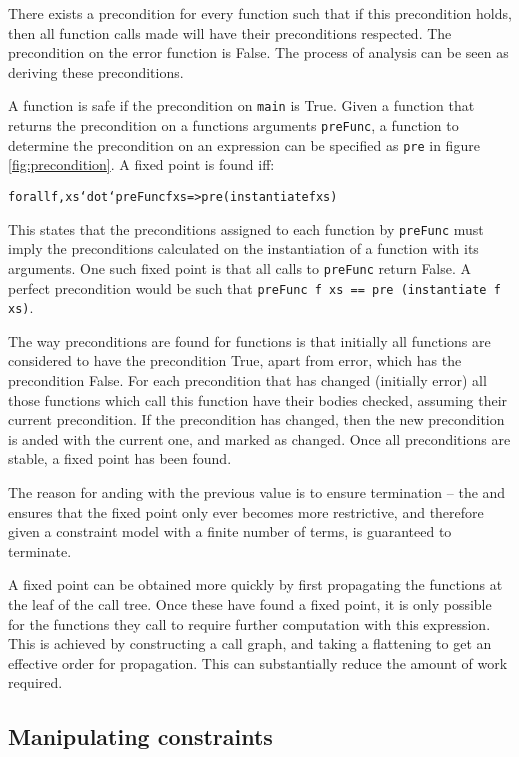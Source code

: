 \documentclass[preprint]{sigplanconf}
\newcommand{\T}[1]{\texttt{#1}}
\newcommand{\C}[1]{\textsf{#1}}
\newenvironment{code}{\begin{alltt}\small}{\end{alltt}}
\begin{document}
There exists a precondition for every function such that if this precondition holds, then all function calls made will have their preconditions respected. The precondition on the \C{error} function is False. The process of analysis can be seen as deriving these preconditions.

A function is safe if the precondition on \T{main} is True. Given a function that returns the precondition on a functions arguments \T{preFunc}, a function to determine the precondition on an expression can be specified as \T{pre} in figure \ref{fig:precondition}. A fixed point is found iff:

\begin{code}
forall f, xs `dot` preFunc f xs => pre (instantiate f xs)
\end{code}

This states that the preconditions assigned to each function by \T{preFunc} must imply the preconditions calculated on the instantiation of a function with its arguments. One such fixed point is that all calls to \T{preFunc} return False. A perfect precondition would be such that \T{preFunc f xs == pre (instantiate f xs)}.

The way preconditions are found for functions is that initially all functions are considered to have the precondition True, apart from error, which has the precondition False. For each precondition that has changed (initially error) all those functions which call this function have their bodies checked, assuming their current precondition. If the precondition has changed, then the new precondition is anded with the current one, and marked as changed. Once all preconditions are stable, a fixed point has been found.

The reason for anding with the previous value is to ensure termination -- the and ensures that the fixed point only ever becomes more restrictive, and therefore given a constraint model with a finite number of terms, is guaranteed to terminate.

A fixed point can be obtained more quickly by first propagating the functions at the leaf of the call tree. Once these have found a fixed point, it is only possible for the functions they call to require further computation with this expression. This is achieved by constructing a call graph, and taking a flattening to get an effective order for propagation. This can substantially reduce the amount of work required.


\subsection{Manipulating constraints}
\label{sec:backward}
\end{document}
